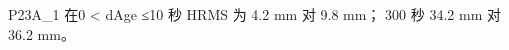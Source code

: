 \documentclass[11pt,a4paper]{article}
\begin{document}
P23A\_1 {\cjkfont 在}\allowbreak{}0 < dAge ≤10 {\cjkfont 秒}\allowbreak{} HRMS {\cjkfont 为}\allowbreak{} 4.2 mm {\cjkfont 对}\allowbreak{} 9.8 mm{\cjkfont ；}\allowbreak{} 300 {\cjkfont 秒}\allowbreak{} 34.2 mm {\cjkfont 对}\allowbreak{} 36.2 mm{\cjkfont 。}\allowbreak{}
\end{document}
